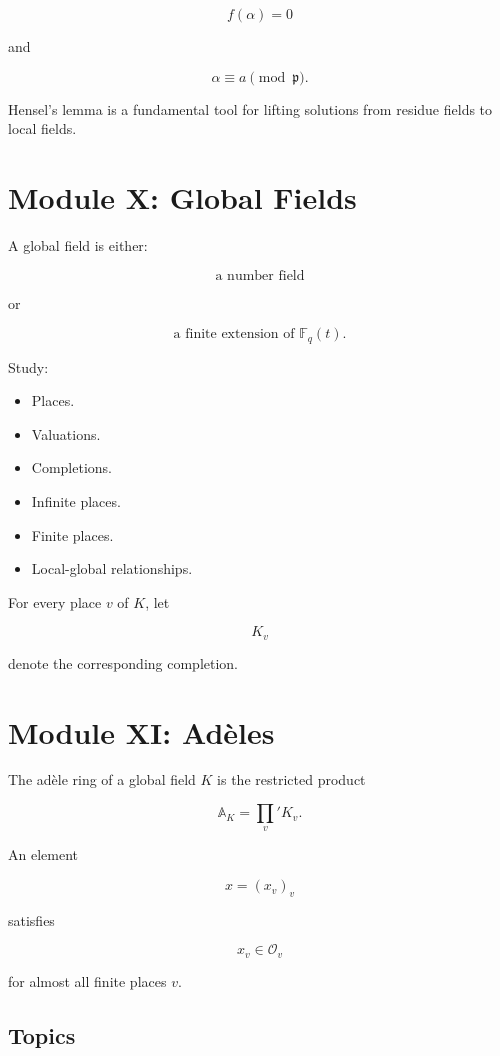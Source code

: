 \documentclass[11pt]{article}
\begin{document}
\[
f(\alpha)=0
\]

and

\[
\alpha\equiv a\pmod{\mathfrak{p}}.
\]

Hensel's lemma is a fundamental tool for lifting solutions
from residue fields to local fields.

\section{Module X: Global Fields}

A global field is either:

\[
\text{a number field}
\]

or

\[
\text{a finite extension of }\mathbb{F}_q(t).
\]

Study:

\begin{itemize}
    \item Places.
    \item Valuations.
    \item Completions.
    \item Infinite places.
    \item Finite places.
    \item Local-global relationships.
\end{itemize}

For every place $v$ of $K$, let

\[
K_v
\]

denote the corresponding completion.

\section{Module XI: Adèles}

The adèle ring of a global field $K$ is the restricted product

\[
\boxed{
\mathbb{A}_K
=
\prod_v' K_v.
}
\]

An element

\[
x=(x_v)_v
\]

satisfies

\[
x_v\in\mathcal{O}_v
\]

for almost all finite places $v$.

\subsection{Topics}
\end{document}
